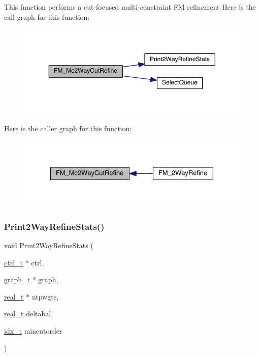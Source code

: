 This function performs a cut-\/focused multi-\/constraint FM refinement Here is the call graph for this function\+:\nopagebreak
\begin{figure}[H]
\begin{center}
\leavevmode
\includegraphics[width=350pt]{a00197_aaa49d065f964af00512da0c4b3d4cad6_cgraph}
\end{center}
\end{figure}
Here is the caller graph for this function\+:\nopagebreak
\begin{figure}[H]
\begin{center}
\leavevmode
\includegraphics[width=328pt]{a00197_aaa49d065f964af00512da0c4b3d4cad6_icgraph}
\end{center}
\end{figure}
\mbox{\label{a00197_a6e4663b4acc63be2c1b33533e7827f1a}} 
\subsubsection{\texorpdfstring{Print2\+Way\+Refine\+Stats()}{Print2WayRefineStats()}}
{\footnotesize\ttfamily void Print2\+Way\+Refine\+Stats (\begin{DoxyParamCaption}\item[{\hyperlink{a00742}{ctrl\+\_\+t} $\ast$}]{ctrl,  }\item[{\hyperlink{a00734}{graph\+\_\+t} $\ast$}]{graph,  }\item[{\hyperlink{a00876_a1924a4f6907cc3833213aba1f07fcbe9}{real\+\_\+t} $\ast$}]{ntpwgts,  }\item[{\hyperlink{a00876_a1924a4f6907cc3833213aba1f07fcbe9}{real\+\_\+t}}]{deltabal,  }\item[{\hyperlink{a00876_aaa5262be3e700770163401acb0150f52}{idx\+\_\+t}}]{mincutorder }\end{DoxyParamCaption})}

